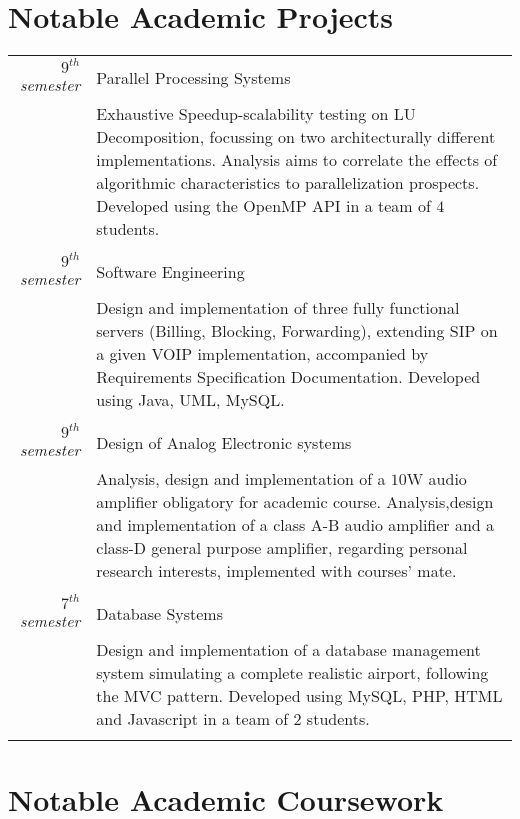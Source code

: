 \documentclass[a4paper,10pt]{article}
\begin{document}
\section{Notable Academic Projects}
\begin{longtable}{r|p{15cm}}
\textit{$9^{th}$ semester} & \large{Parallel Processing Systems}
\\& Exhaustive Speedup-scalability testing on LU Decomposition, focussing on two architecturally different implementations. Analysis aims to correlate the effects of algorithmic characteristics to parallelization prospects. Developed using the OpenMP API in a team of $4$ students.\\\multicolumn{2}{c}{}\\
\textit{$9^{th}$ semester} & \large{Software Engineering} 
\\& Design and implementation of three fully functional servers (Billing, Blocking, Forwarding), extending SIP on a given VOIP implementation, accompanied by Requirements Specification Documentation. Developed using Java, UML, MySQL.\\\multicolumn{2}{c}{}\\
\textit{$9^{th}$ semester} & \large{Design of Analog Electronic systems} 
\\& Analysis, design and implementation of a $10$W audio amplifier obligatory for academic course. Analysis,design and implementation of a class A-B audio amplifier and a class-D general purpose amplifier, regarding personal research interests, implemented with courses' mate.\\\multicolumn{2}{c}{}\\
\textit{$7^{th}$ semester} & \large{Database Systems} 
\\*& Design and implementation of a database management system simulating a complete realistic airport, following the MVC pattern. Developed using MySQL, PHP, HTML and Javascript in a team of $2$ students.\\\multicolumn{2}{c}{}
\end{longtable}

\section{Notable Academic Coursework}
\end{document}
